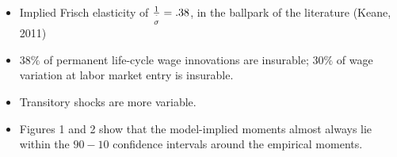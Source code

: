 \documentclass[notes=show]{beamer}
\begin{document}
\bigskip

\begin{frame}%


\begin{itemize}
\item Implied Frisch elasticity of $\frac{1}{\overset{\symbol{94}}{\sigma }}%
=.38$, in the ballpark of the literature (Keane, 2011)

\item $38\%$ of permanent life-cycle wage innovations are insurable; $30\%$
of wage variation at labor market entry is insurable.

\item Transitory shocks are more variable.

\item Figures 1 and 2 show that the model-implied moments almost always lie
within the $90-10$ confidence intervals around the empirical moments.
\end{itemize}

\transboxout%
\end{frame}%

\bigskip

\begin{frame}%


\begin{center}
\end{center}

\transboxout%
\end{frame}%
\end{document}
